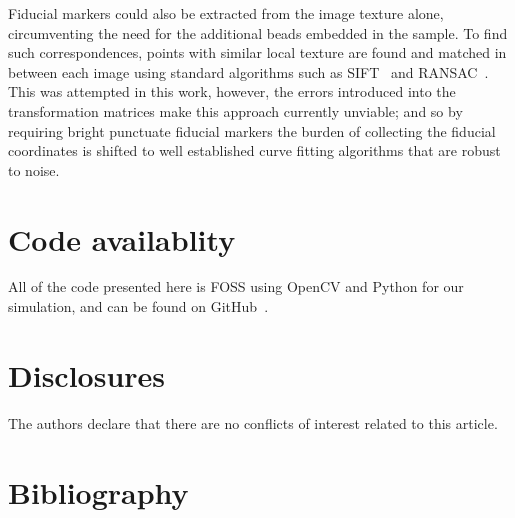 \documentclass{osa-article}
\begin{document}
Fiducial markers could also be extracted from the image texture alone, circumventing the need for the additional beads embedded in the sample.
To find such correspondences, points with similar local texture are found and matched in between each image using standard algorithms such as SIFT~\cite{loweObjectRecognitionLocal1999} and RANSAC~\cite{fischlerRandomSampleConsensus1981}. %
This was attempted in this work, however, the errors introduced into the transformation matrices make this approach currently unviable; and so by requiring bright punctuate fiducial markers the burden of collecting the fiducial coordinates is shifted to well established curve fitting algorithms that are robust to noise.


\section*{Code availablity}
All of the code presented here is FOSS using OpenCV and Python for our simulation, and can be found on GitHub~\cite{craig_russell_2020_4073437}.

\section*{Disclosures}
The authors declare that there are no conflicts of interest related to this article.

\section*{Bibliography}
% 
% 
% 

\onecolumn
\newpage
%
\end{document}
